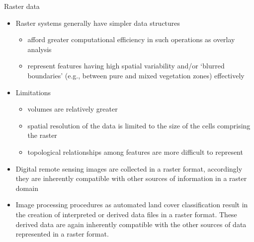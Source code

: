 \documentclass[11pt,dvipsnames,ignorenonframetext,aspectratio=169]{beamer}
\providecommand{\tightlist}{%
  \setlength{\itemsep}{0pt}\setlength{\parskip}{0pt}}
\begin{document}
\begin{frame}{Raster data}
\protect\hypertarget{raster-data}{}
\begin{itemize}
\tightlist
\item
  Raster systems generally have simpler data structures

  \begin{itemize}
  \tightlist
  \item
    afford greater computational efficiency in such operations as
    overlay analysis
  \item
    represent features having high spatial variability and/or `blurred
    boundaries' (e.g., between pure and mixed vegetation zones)
    effectively
  \end{itemize}
\item
  Limitations

  \begin{itemize}
  \tightlist
  \item
    volumes are relatively greater
  \item
    spatial resolution of the data is limited to the size of the cells
    comprising the raster
  \item
    topological relationships among features are more difficult to
    represent
  \end{itemize}
\item
  Digital remote sensing images are collected in a raster format,
  accordingly they are inherently compatible with other sources of
  information in a raster domain
\item
  Image processing procedures as automated land cover classification
  result in the creation of interpreted or derived data files in a
  raster format. These derived data are again inherently compatible with
  the other sources of data represented in a raster format.
\end{itemize}
\end{frame}
\end{document}
